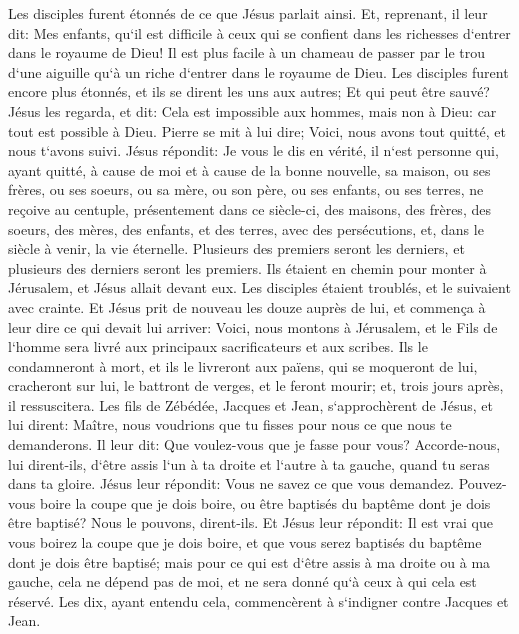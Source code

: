 \verse Les disciples furent étonnés de ce que Jésus parlait ainsi. Et, reprenant, il leur dit: Mes enfants, qu`il est difficile à ceux qui se confient dans les richesses d`entrer dans le royaume de Dieu! 
\verse Il est plus facile à un chameau de passer par le trou d`une aiguille qu`à un riche d`entrer dans le royaume de Dieu. 
\verse Les disciples furent encore plus étonnés, et ils se dirent les uns aux autres; Et qui peut être sauvé? 
\verse Jésus les regarda, et dit: Cela est impossible aux hommes, mais non à Dieu: car tout est possible à Dieu. 
\verse Pierre se mit à lui dire; Voici, nous avons tout quitté, et nous t`avons suivi. 
\verse Jésus répondit: Je vous le dis en vérité, il n`est personne qui, ayant quitté, à cause de moi et à cause de la bonne nouvelle, sa maison, ou ses frères, ou ses soeurs, ou sa mère, ou son père, ou ses enfants, ou ses terres, 
\verse ne reçoive au centuple, présentement dans ce siècle-ci, des maisons, des frères, des soeurs, des mères, des enfants, et des terres, avec des persécutions, et, dans le siècle à venir, la vie éternelle. 
\verse Plusieurs des premiers seront les derniers, et plusieurs des derniers seront les premiers. 
\verse Ils étaient en chemin pour monter à Jérusalem, et Jésus allait devant eux. Les disciples étaient troublés, et le suivaient avec crainte. Et Jésus prit de nouveau les douze auprès de lui, et commença à leur dire ce qui devait lui arriver: 
\verse Voici, nous montons à Jérusalem, et le Fils de l`homme sera livré aux principaux sacrificateurs et aux scribes. Ils le condamneront à mort, et ils le livreront aux païens, 
\verse qui se moqueront de lui, cracheront sur lui, le battront de verges, et le feront mourir; et, trois jours après, il ressuscitera. 
\verse Les fils de Zébédée, Jacques et Jean, s`approchèrent de Jésus, et lui dirent: Maître, nous voudrions que tu fisses pour nous ce que nous te demanderons. 
\verse Il leur dit: Que voulez-vous que je fasse pour vous? 
\verse Accorde-nous, lui dirent-ils, d`être assis l`un à ta droite et l`autre à ta gauche, quand tu seras dans ta gloire. 
\verse Jésus leur répondit: Vous ne savez ce que vous demandez. Pouvez-vous boire la coupe que je dois boire, ou être baptisés du baptême dont je dois être baptisé? Nous le pouvons, dirent-ils. 
\verse Et Jésus leur répondit: Il est vrai que vous boirez la coupe que je dois boire, et que vous serez baptisés du baptême dont je dois être baptisé; 
\verse mais pour ce qui est d`être assis à ma droite ou à ma gauche, cela ne dépend pas de moi, et ne sera donné qu`à ceux à qui cela est réservé. 
\verse Les dix, ayant entendu cela, commencèrent à s`indigner contre Jacques et Jean. 
